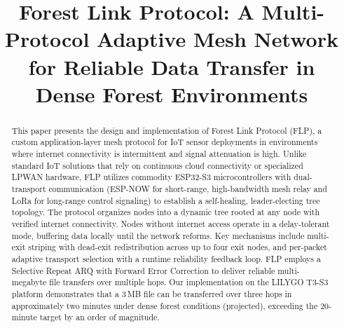 \documentclass[conference]{IEEEtran}
\begin{document}
\title{Forest Link Protocol: A Multi-Protocol Adaptive Mesh Network for Reliable Data Transfer in Dense Forest Environments}

\author{
}

\maketitle

\begin{abstract}
This paper presents the design and implementation of Forest Link Protocol (FLP), a custom application-layer mesh protocol for IoT sensor deployments in environments where internet connectivity is intermittent and signal attenuation is high. Unlike standard IoT solutions that rely on continuous cloud connectivity or specialized LPWAN hardware, FLP utilizes commodity ESP32-S3 microcontrollers with dual-transport communication (ESP-NOW for short-range, high-bandwidth mesh relay and LoRa for long-range control signaling) to establish a self-healing, leader-electing tree topology. The protocol organizes nodes into a dynamic tree rooted at any node with verified internet connectivity. Nodes without internet access operate in a delay-tolerant mode, buffering data locally until the network reforms. Key mechanisms include multi-exit striping with dead-exit redistribution across up to four exit nodes, and per-packet adaptive transport selection with a runtime reliability feedback loop. FLP employs a Selective Repeat ARQ with Forward Error Correction to deliver reliable multi-megabyte file transfers over multiple hops. Our implementation on the LILYGO T3-S3 platform demonstrates that a 3\,MB file can be transferred over three hops in approximately two minutes under dense forest conditions (projected), exceeding the 20-minute target by an order of magnitude.
\end{abstract}

\end{document}
